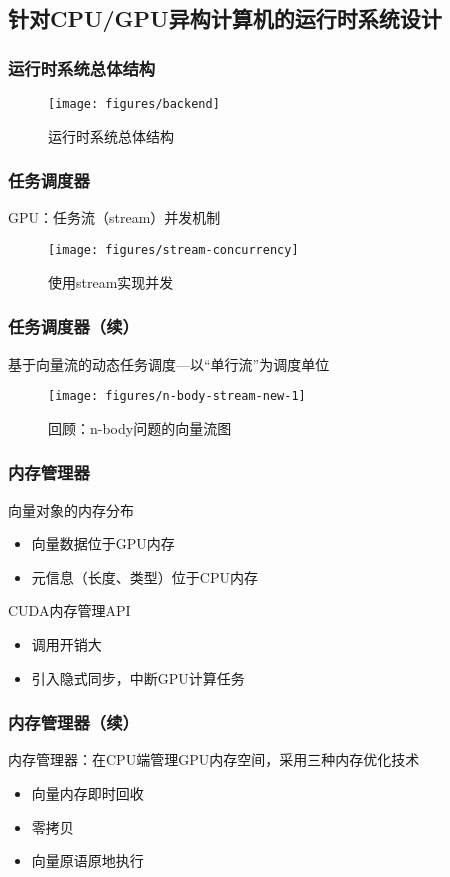 \documentclass[]{beamer}
\begin{document}
\subsection{针对CPU/GPU异构计算机的运行时系统设计}

\begin{frame}
  \frametitle{运行时系统总体结构}
    \begin{figure}
    \centering
    \texttt{[image: figures/backend]}
    \caption{运行时系统总体结构}
  \end{figure}
\end{frame}

\begin{frame}
  \frametitle{任务调度器}
  GPU：任务流（stream）并发机制
  \begin{figure}
    \centering
    \texttt{[image: figures/stream-concurrency]}
    \caption{使用stream实现并发}
  \end{figure}
\end{frame}

\begin{frame}
  \frametitle{任务调度器（续）}
  基于向量流的动态任务调度---以“单行流”为调度单位
  \begin{figure}
    \centering
    \texttt{[image: figures/n-body-stream-new-1]}
    \caption{回顾：n-body问题的向量流图}
  \end{figure}
\end{frame}

\begin{frame}
  \frametitle{内存管理器}
  向量对象的内存分布
  \begin{itemize}
    \item 向量数据位于GPU内存
    \item 元信息（长度、类型）位于CPU内存
  \end{itemize}
  \pause
  CUDA内存管理API
  \begin{itemize}
    \item 调用开销大
    \item 引入隐式同步，中断GPU计算任务
  \end{itemize}
\end{frame}

\begin{frame}
  \frametitle{内存管理器（续）}
  内存管理器：在CPU端管理GPU内存空间，采用三种内存优化技术
  \begin{itemize}
    \item 向量内存即时回收
    \item 零拷贝
    \item 向量原语原地执行
  \end{itemize}
\end{frame}
\end{document}
